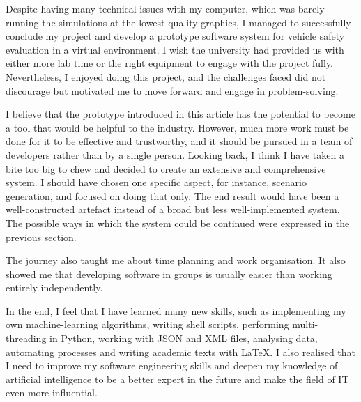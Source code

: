 Despite having many technical issues with my computer, which was barely running the simulations at the lowest quality graphics, I managed to successfully conclude my project and develop a prototype software system for vehicle safety evaluation in a virtual environment. I wish the university had provided us with either more lab time or the right equipment to engage with the project fully. Nevertheless, I enjoyed doing this project, and the challenges faced did not discourage but motivated me to move forward and engage in problem-solving.

I believe that the prototype introduced in this article has the potential to become a tool that would be helpful to the industry. However, much more work must be done for it to be effective and trustworthy, and it should be pursued in a team of developers rather than by a single person. Looking back, I think I have taken a bite too big to chew and decided to create an extensive and comprehensive system. I should have chosen one specific aspect, for instance, scenario generation, and focused on doing that only. The end result would have been a well-constructed artefact instead of a broad but less well-implemented system. The possible ways in which the system could be continued were expressed in the previous section.

The journey also taught me about time planning and work organisation. It also showed me that developing software in groups is usually easier than working entirely independently.

In the end, I feel that I have learned many new skills, such as implementing my own machine-learning algorithms, writing shell scripts, performing multi-threading in Python, working with JSON and XML files, analysing data, automating processes and writing academic texts with LaTeX. I also realised that I need to improve my software engineering skills and deepen my knowledge of artificial intelligence to be a better expert in the future and make the field of IT even more influential.
